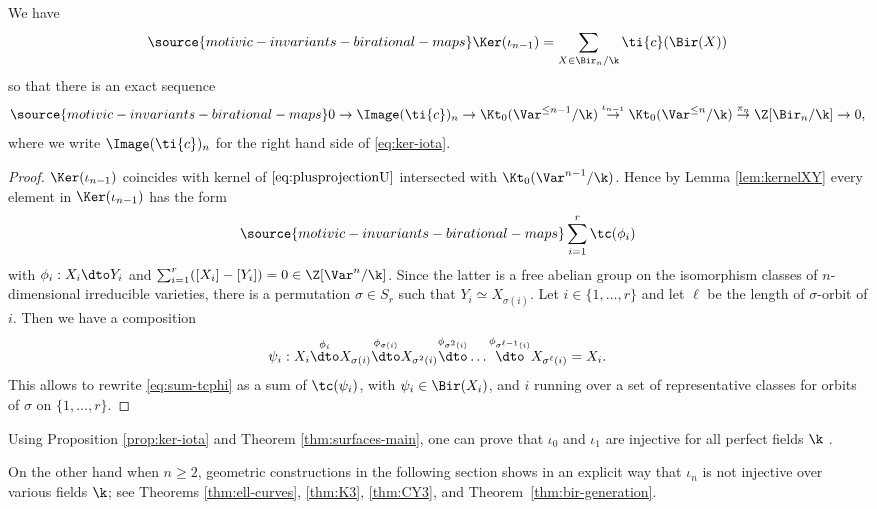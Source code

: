 \begin{proposition}
\notready\label{prop:ker-iota}
We have
\begin{equation}\label{eq:ker-iota}
\source{motivic-invariants-birational-maps}
\Ker(\iota_{n-1}) = \sum_{X \in \Bir_n/\k} \ti{c}(\Bir(X))
\end{equation}
so that there is an exact sequence
\begin{equation}\label{eq:seq-K0}
\source{motivic-invariants-birational-maps}
0 \to \Image(\ti{c})_n \to \Kt_0(\Var^{\le n-1}/\k) \overset{\iota_{n-1}}\to \Kt_0(\Var^{\le n}/\k) \overset{\pi_n}\to \Z[\Bir_n/\k] \to 0,
\end{equation}
where we write $\Image(\ti{c})_n$ for the right hand side
of \eqref{eq:ker-iota}.
\end{proposition}
\begin{proof}
$\Ker(\iota_{n-1})$ coincides with kernel of $\eqref{eq:plusprojectionU}$
intersected with $\Kt_0(\Var^{n-1}/\k)$.
Hence by Lemma \ref{lem:kernelXY} every element in
$\Ker(\iota_{n-1})$ has the form
\begin{equation}\label{eq:sum-tcphi}
\source{motivic-invariants-birational-maps}
\sum_{i=1}^r \tc(\phi_i)
\end{equation}
with $\phi_i: X_i \dto Y_i$
and $\sum_{i=1}^r ([X_i] - [Y_i]) = 0 \in \Z[\Var^n/\k]$.
Since the latter is a free abelian group on the isomorphism
classes of $n$-dimensional irreducible varieties,
there is a permutation $\sigma \in S_r$ such that
$Y_i \simeq X_{\sigma(i)}$.
Let $i \in \{1, \dots, r\}$ and let $\ell$ be the length
of $\sigma$-orbit of $i$. Then we have a composition
\[
\psi_i: X_i \overset{\phi_i}{\dto} X_{\sigma(i)} \overset{\phi_{\sigma(i)}}{\dto} X_{\sigma^2(i)} \overset{\phi_{\sigma^2(i)}}{\dto} \dots
\overset{\phi_{\sigma^{\ell-1}(i)}}{\dto}
X_{\sigma^\ell(i)}  =  X_i.
\]
This allows to rewrite \eqref{eq:sum-tcphi}
as a sum of $\tc(\psi_i)$, with $\psi_i \in \Bir(X_i)$,
and $i$ running over a set of representative classes
for orbits of $\sigma$ on $\{1, \dots, r\}$.
\end{proof}

\begin{remark}
\notready\label{rem:iota-injectivity}
Using Proposition \ref{prop:ker-iota}
and
Theorem \ref{thm:surfaces-main},
one can prove that
$\iota_0$ and
$\iota_1$ are injective
for all perfect fields $\k$ \cite[Corollary 3.10]{LSZ20}.

On the other hand when $n \ge 2$, geometric constructions in the following
section
shows in an explicit way that $\iota_n$ is not injective
over various fields $\k$;
see Theorems \ref{thm:ell-curves}, \ref{thm:K3},
\ref{thm:CY3}, and Theorem~\ref{thm:bir-generation}.
\end{remark}
